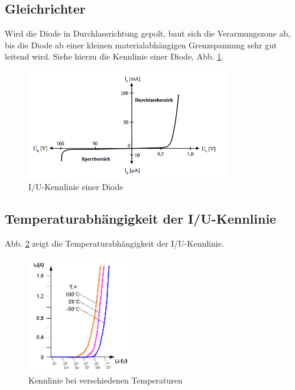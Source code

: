 \subsection*{Gleichrichter}
Wird die Diode in Durchlassrichtung gepolt, baut sich die Verarmungszone ab, bis die Diode ab einer kleinen materialabhängigen Grenzspannung sehr gut leitend wird. Siehe hierzu die Kennlinie einer Diode, Abb. \ref{diodekenn}.
\begin{figure}[htb]
	\centering
	\includegraphics[width=0.8\textwidth]{Abb/Diodenkennlinie.png}
	\caption{I/U-Kennlinie einer Diode}
	\label{diodekenn}
\end{figure}


\subsection*{Temperaturabhängigkeit der I/U-Kennlinie}
Abb. \ref{kenntemp} zeigt die Temperaturabhängigkeit der I/U-Kennlinie.
\begin{figure}[htb]
	\centering
	\includegraphics[width=0.4\textwidth]{Abb/diodekenn_temp.jpg}
	\caption{Kennlinie bei verschiedenen Temperaturen}
	\label{kenntemp}
\end{figure}
